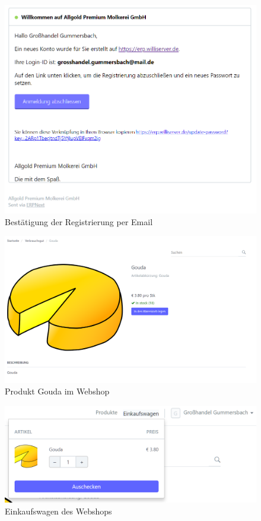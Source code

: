 \begin{figure}
  \centering
  \includegraphics[width=\textwidth]{Bilder/Registrierung_Mail.PNG}
  \caption{Bestätigung der Registrierung per Email}
  \label{fig:regMail}
\end{figure}
\begin{figure}
  \centering
  \includegraphics[width=\textwidth]{Bilder/Webshop_Gouda.PNG}
  \caption{Produkt Gouda im Webshop}
  \label{fig:webGouda}
\end{figure}
\begin{figure}
  \centering
  \includegraphics[width=\textwidth]{Bilder/Einkaufswagen.PNG}
  \caption{Einkaufswagen des Webshops}
  \label{fig:webChart}
\end{figure}

